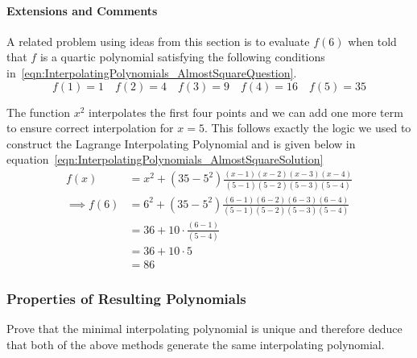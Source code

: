 \paragraph{Extensions and Comments}


A related problem using ideas from this section is to evaluate $f(6)$ when told that $f$ is a quartic polynomial satisfying the following conditions in~\eqref{eqn:InterpolatingPolynomials_AlmostSquareQuestion}.
\begin{equation}
	f(1) = 1 \quad f(2) = 4 \quad f(3) = 9 \quad f(4) = 16 \quad f(5) = 35
	\label{eqn:InterpolatingPolynomials_AlmostSquareQuestion}
\end{equation}

The function $x^2$ interpolates the first four points and we can add one more term to ensure correct interpolation for $x = 5$. This follows exactly the logic we used to construct the Lagrange Interpolating Polynomial and is given below in equation~\eqref{eqn:InterpolatingPolynomials_AlmostSquareSolution}
\begin{subequations}
	\begin{align}
		f(x) &= x^2 + \left( 35 - 5^2 \right) \frac{(x - 1)(x - 2)(x - 3)(x - 4)}{(5 - 1)(5 - 2)(5 - 3)(5 - 4)}  \\
		\implies f(6) &= 6^2 + \left( 35 - 5^2 \right) \frac{(6 - 1)(6 - 2)(6 - 3)(6 - 4)}{(5 - 1)(5 - 2)(5 - 3)(5 - 4)}  \\
		&= 36 + 10 \cdot \frac{(6 - 1)}{(5 - 4)}  \\
		&= 36 + 10 \cdot 5 \\
		&= 86
	\end{align}
	\label{eqn:InterpolatingPolynomials_AlmostSquareSolution}
\end{subequations}

\subsubsection{Properties of Resulting Polynomials}
\label{subsubsec:PropertiesOfResultingPolynomials}

Prove that the minimal interpolating polynomial is unique and therefore deduce that both of the above methods generate the same interpolating polynomial.


